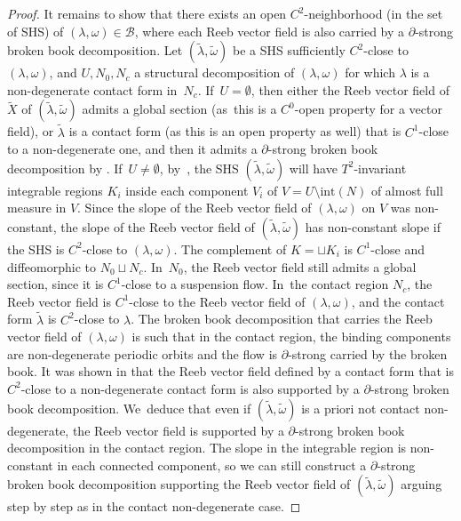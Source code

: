 \begin{proof}
It remains to show that there exists an open $C^2$-neighborhood (in the set of SHS) of $(\lambda,\omega)\in \mathcal{B}$, where each Reeb vector field is also carried by a $\partial$-strong broken book decomposition. Let $(\widetilde \lambda, \widetilde \omega)$ be a SHS sufficiently $C^2$-close to $(\lambda,\omega)$, and $U, N_0, N_c$ a structural decomposition of $(\lambda,\omega)$ for which $\lambda$ is a non-degenerate contact form in~$N_c$. If~$U=\emptyset$, then either the Reeb vector field of $\widetilde X$ of $(\widetilde \lambda, \widetilde \omega)$ admits a global section (as~this is a $C^0$-open property for a vector field), or $\widetilde \lambda$ is a contact form (as this is an open property as well) that is $C^1$-close to a non-degenerate one, and then it admits a $\partial$-strong broken book decomposition by \cite[Th.\,1.1]{CDR}. If~$U\neq \emptyset$, by~\cite[Th.\,3.7]{CV1}, the SHS $(\widetilde \lambda, \widetilde \omega)$ will have $T^2$-invariant integrable regions $K_i$ inside each component $V_i$ of $V=U\setminus \text{int}(N)$ of almost full measure in $V$. Since the slope of the Reeb vector field of $(\lambda,\omega)$ on $V$ was non-constant, the slope of the Reeb vector field of $(\widetilde \lambda, \widetilde \omega)$ has non-constant slope if the SHS is $C^2$-close to $(\lambda,\omega)$. The complement of $K=\sqcup K_i$ is $C^1$-close and diffeomorphic to $N_0\sqcup N_c$. In~$N_0$, the Reeb vector field still admits a global section, since it is $C^1$-close to a suspension flow. In~the contact region $N_c$, the Reeb vector field is $C^1$-close to the Reeb vector field of $(\lambda, \omega)$, and the contact form $\widetilde \lambda$ is $C^2$-close to $\lambda$. The broken book decomposition that carries the Reeb vector field of $(\lambda,\omega)$ is such that in the contact region, the binding components are non-degenerate periodic orbits and the flow is $\partial$-strong carried by the broken book. It was shown in \cite[\S 4.7]{CDR} that the Reeb vector field defined by a contact form that is $C^2$-close to a non-degenerate contact form is also supported by a $\partial$-strong broken book decomposition. We~deduce that even if
$(\widetilde \lambda, \widetilde \omega)$ is a priori not contact non-degenerate, the Reeb vector field is supported by a $\partial$-strong broken book decomposition in the contact region.
The slope in the integrable region is non-constant in each connected component, so we can still construct a $\partial$-strong broken book decomposition supporting the Reeb vector field of $(\widetilde \lambda, \widetilde \omega)$ arguing step by step as in the contact non-degenerate case.
\end{proof}

